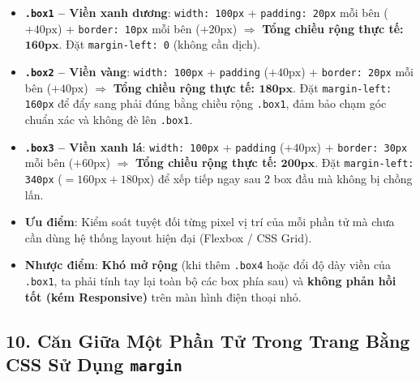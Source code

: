 \documentclass[11pt,oneside]{book}
\newcommand{\codeinline}[1]{\textcolor{accentOrange}{\texttt{#1}}}
\DeclareRobustCommand{\csshint}[1]{\texorpdfstring{\textcolor{accentOrange}{\textbf{\texttt{#1}}}}{#1}}
\begin{document}
\begin{noteBox}
\begin{itemize}[leftmargin=1.5em, itemsep=3.5pt, parsep=0pt]
    \item \textbf{\codeinline{.box1} -- Viền xanh dương}: \codeinline{width: 100px} + \codeinline{padding: 20px} mỗi bên ($+40\text{px}$) + \codeinline{border: 10px} mỗi bên ($+20\text{px}$) $\Longrightarrow$ \textbf{Tổng chiều rộng thực tế: $\mathbf{160\text{px}}$}. Đặt \codeinline{margin-left: 0} (không cần dịch).
    \item \textbf{\codeinline{.box2} -- Viền vàng}: \codeinline{width: 100px} + \codeinline{padding} ($+40\text{px}$) + \codeinline{border: 20px} mỗi bên ($+40\text{px}$) $\Longrightarrow$ \textbf{Tổng chiều rộng thực tế: $\mathbf{180\text{px}}$}. Đặt \codeinline{margin-left: 160px} để đẩy sang phải đúng bằng chiều rộng \codeinline{.box1}, đảm bảo chạm góc chuẩn xác và không đè lên \codeinline{.box1}.
    \item \textbf{\codeinline{.box3} -- Viền xanh lá}: \codeinline{width: 100px} + \codeinline{padding} ($+40\text{px}$) + \codeinline{border: 30px} mỗi bên ($+60\text{px}$) $\Longrightarrow$ \textbf{Tổng chiều rộng thực tế: $\mathbf{200\text{px}}$}. Đặt \codeinline{margin-left: 340px} ($= 160\text{px} + 180\text{px}$) để xếp tiếp ngay sau 2 box đầu mà không bị chồng lấn.
\end{itemize}
\end{noteBox}

\begin{warnBox}
\begin{itemize}[leftmargin=1.5em, itemsep=2.5pt, parsep=0pt]
    \item \textbf{Ưu điểm}: Kiểm soát tuyệt đối từng pixel vị trí của mỗi phần tử mà chưa cần dùng hệ thống layout hiện đại (Flexbox / CSS Grid).
    \item \textbf{Nhược điểm}: \textbf{Khó mở rộng} (khi thêm \codeinline{.box4} hoặc đổi độ dày viền của \codeinline{.box1}, ta phải tính tay lại toàn bộ các box phía sau) và \textbf{không phản hồi tốt (kém Responsive)} trên màn hình điện thoại nhỏ.
\end{itemize}
\end{warnBox}

\subsection{10. Căn Giữa Một Phần Tử Trong Trang Bằng CSS Sử Dụng \csshint{margin}}
\end{document}
